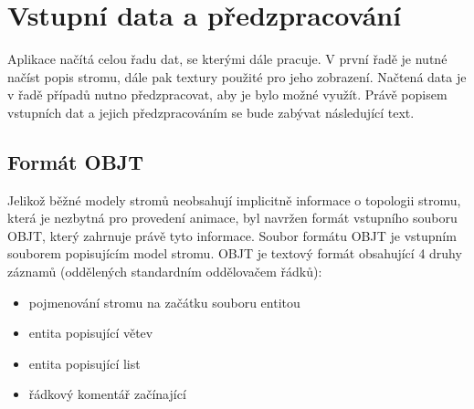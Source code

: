 \section{Vstupní data a předzpracování}
\label{sec-modelAnalysis}
Aplikace načítá celou řadu dat, se kterými dále pracuje. V první řadě je nutné načíst popis stromu, dále pak textury použité pro jeho zobrazení. Načtená data je v řadě případů nutno předzpracovat, aby je bylo možné využít. Právě popisem vstupních dat a jejich předzpracováním se bude zabývat následující text.

\subsection{Formát OBJT}
Jelikož běžné modely stromů neobsahují implicitně informace o topologii stromu, která je nezbytná pro provedení animace, byl navržen formát vstupního souboru OBJT, který zahrnuje právě tyto informace. Soubor formátu OBJT je vstupním souborem popisujícím model stromu. OBJT je textový formát obsahující 4 druhy záznamů (oddělených standardním oddělovačem řádků):
\begin{itemize}
\item pojmenování stromu na začátku souboru entitou 
\item entita popisující větev 
\item entita popisující list  
\item řádkový komentář začínající 
\end{itemize}


